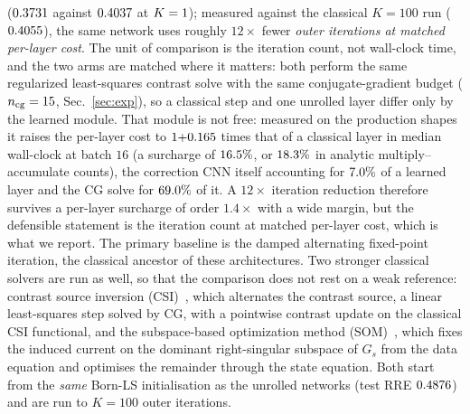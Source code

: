 \documentclass[journal,cmes,article,submit,moreauthors,pdftex]{Definitions/tsp}
\newcommand{\numv}[1]{#1}
\begin{document}
($\numv{\NumConsEight}$ against $\numv{\NumClassBest}$ at $K=\numv{\NumClassBestK}$); measured
against the classical $K=100$ run ($\numv{\NumClassHundred}$), the same network uses roughly
$12\times$ fewer \emph{outer iterations at matched per-layer cost}. The unit of comparison is the iteration
count, not wall-clock time, and the two arms are matched where it matters: both perform the same
regularized least-squares contrast solve with the same conjugate-gradient budget
($n_{\mathrm{cg}}=\numv{\NumNCg}$, Sec.~\ref{sec:exp}), so a classical step and one unrolled layer
differ only by the learned module. That module is not free: measured on the production shapes it
raises the per-layer cost to $1{+}\numv{\NumCostLayerOverhead}$ times that of a classical layer in
median wall-clock at batch $16$ (a surcharge of $\numv{\NumCostLayerOverheadPct}\%$, or
$\numv{\NumCostMacOverheadPct}\%$ in analytic multiply--accumulate counts), the correction CNN
itself accounting for $\numv{\NumCostCnnPct}\%$ of a learned layer and the CG solve for
$\numv{\NumCostCgPct}\%$ of it. A $12\times$ iteration reduction therefore
survives a per-layer surcharge of order $1.4\times$ with a wide margin, but the defensible statement is the iteration count at matched per-layer cost, which is what we report. The primary
baseline is the damped alternating fixed-point iteration, the classical ancestor of these
architectures. Two stronger classical solvers are run as well, so that the comparison does not rest on
a weak reference: contrast source inversion (CSI)~\cite{csi_lit}, which alternates the contrast source, a linear least-squares step solved by CG, with a pointwise contrast update on the classical CSI
functional, and the subspace-based optimization method (SOM)~\cite{som_lit}, which fixes the induced
current on the dominant right-singular subspace of $G_s$ from the data equation and optimises the
remainder through the state equation. Both start from the \emph{same} Born-LS initialisation as the
unrolled networks (test RRE $\numv{\NumBornInitRre}$) and are run to $K=100$ outer iterations.
\end{document}
